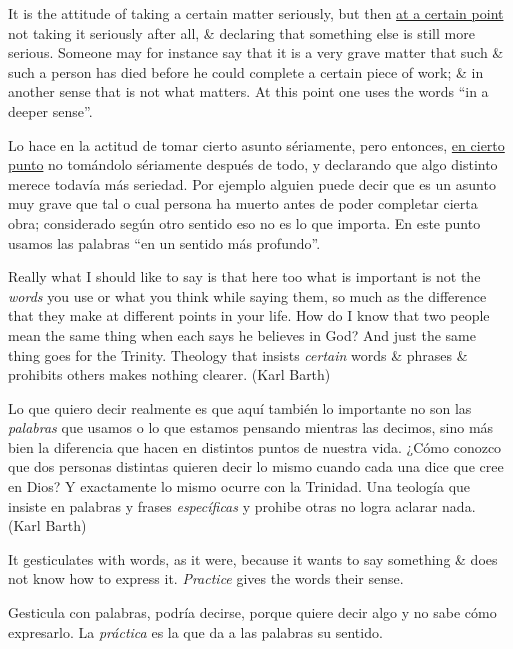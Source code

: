 It is the attitude of taking a certain matter seriously, but then \underline{at a certain point} not taking it seriously after all, \& declaring that something else is still more serious. Someone may for instance say that it is a very grave matter that such \& such a person has died before he could complete a certain piece of work; \& in another sense that is not what matters. At this point one uses the words ``in a deeper sense''.

Lo hace en la actitud de tomar cierto asunto sériamente, pero entonces, \underline{en cierto punto} no tomándolo sériamente después de todo, y declarando que algo distinto merece todavía más seriedad. Por ejemplo alguien puede decir que es un asunto muy grave que tal o cual persona ha muerto antes de poder completar cierta obra; considerado según otro sentido eso no es lo que importa. En este punto usamos las palabras ``en un sentido más profundo''.

Really what I should like to say is that here too what is important is not the \emph{words} you use or what you think while saying them, so much as the difference that they make at different points in your life. How do I know that two people mean the same thing when each says he believes in God? And just the same thing goes for the Trinity. Theology that insists \emph{certain} words \& phrases \& prohibits others makes nothing clearer. (Karl Barth)

Lo que quiero decir realmente es que aquí también lo importante no son las \emph{palabras} que usamos o lo que estamos pensando mientras las decimos, sino más bien la diferencia que hacen en distintos puntos de nuestra vida. ¿Cómo conozco que dos personas distintas quieren decir lo mismo cuando cada una dice que cree en Dios? Y exactamente lo mismo ocurre con la Trinidad. Una teología que insiste en palabras y frases \emph{específicas} y prohibe otras no logra aclarar nada. (Karl Barth)

It gesticulates with words, as it were, because it wants to say something \& does not know how to express it. \emph{Practice} gives the words their sense.

Gesticula con palabras, podría decirse, porque quiere decir algo y no sabe cómo expresarlo. La \emph{práctica} es la que da a las palabras su sentido.


